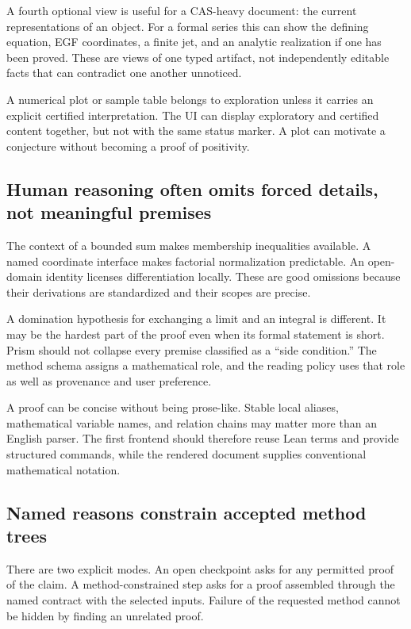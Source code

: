 \documentclass[11pt,a4paper]{article}
\theoremstyle{definition}
\theoremstyle{remark}
\begin{document}
A fourth optional view is useful for a CAS-heavy document: the current representations of an object. For a formal series this can show the defining equation, EGF coordinates, a finite jet, and an analytic realization if one has been proved. These are views of one typed artifact, not independently editable facts that can contradict one another unnoticed.

A numerical plot or sample table belongs to exploration unless it carries an explicit certified interpretation. The UI can display exploratory and certified content together, but not with the same status marker. A plot can motivate a conjecture without becoming a proof of positivity.

\subsection{Human reasoning often omits forced details, not meaningful premises}
The context of a bounded sum makes membership inequalities available. A named coordinate interface makes factorial normalization predictable. An open-domain identity licenses differentiation locally. These are good omissions because their derivations are standardized and their scopes are precise.

A domination hypothesis for exchanging a limit and an integral is different. It may be the hardest part of the proof even when its formal statement is short. Prism should not collapse every premise classified as a ``side condition.'' The method schema assigns a mathematical role, and the reading policy uses that role as well as provenance and user preference.

A proof can be concise without being prose-like. Stable local aliases, mathematical variable names, and relation chains may matter more than an English parser. The first frontend should therefore reuse Lean terms and provide structured commands, while the rendered document supplies conventional mathematical notation.

\subsection{Named reasons constrain accepted method trees}
There are two explicit modes. An open checkpoint asks for any permitted proof of the claim. A method-constrained step asks for a proof assembled through the named contract with the selected inputs. Failure of the requested method cannot be hidden by finding an unrelated proof.
\end{document}
